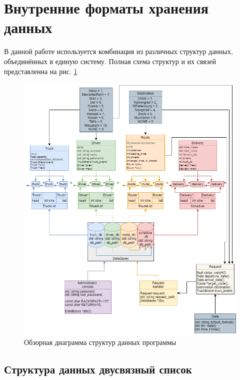 \section{Внутренние форматы хранения данных}
\setcounter{figure}{0}


В данной работе используется комбинация из различных структур данных, 
объединённых в единую систему.
Полная схема структур и их связей представленна на рис. \ref{overall_data_structure} 

\begin{figure}[hpt!]
    \centering
    \includegraphics[width=1\linewidth]{photo/data_structures/overall_data_structure}
    \caption{Обзорная диаграмма структур данных программы}
    \label{overall_data_structure}
\end{figure}

\newpage

\subsection{Структура данных двусвязный список}

